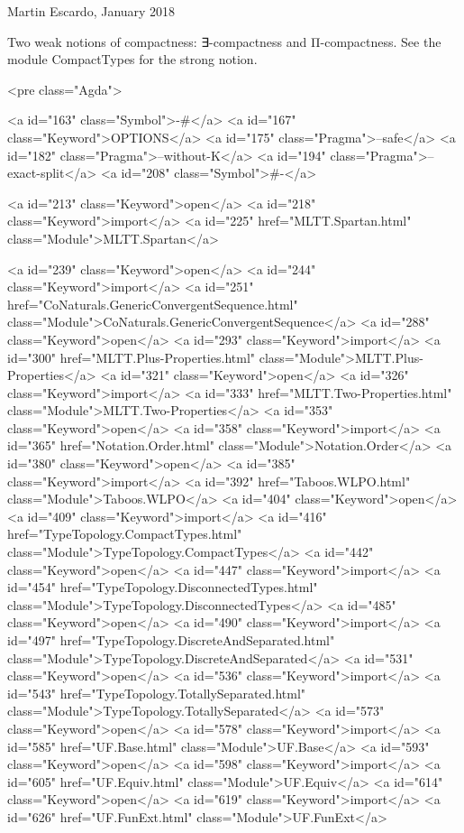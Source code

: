 Martin Escardo, January 2018

Two weak notions of compactness: ∃-compactness and Π-compactness. See
the module CompactTypes for the strong notion.

<pre class="Agda">

<a id="163" class="Symbol">{-#</a> <a id="167" class="Keyword">OPTIONS</a> <a id="175" class="Pragma">--safe</a> <a id="182" class="Pragma">--without-K</a> <a id="194" class="Pragma">--exact-split</a> <a id="208" class="Symbol">#-}</a>

<a id="213" class="Keyword">open</a> <a id="218" class="Keyword">import</a> <a id="225" href="MLTT.Spartan.html" class="Module">MLTT.Spartan</a>

<a id="239" class="Keyword">open</a> <a id="244" class="Keyword">import</a> <a id="251" href="CoNaturals.GenericConvergentSequence.html" class="Module">CoNaturals.GenericConvergentSequence</a>
<a id="288" class="Keyword">open</a> <a id="293" class="Keyword">import</a> <a id="300" href="MLTT.Plus-Properties.html" class="Module">MLTT.Plus-Properties</a>
<a id="321" class="Keyword">open</a> <a id="326" class="Keyword">import</a> <a id="333" href="MLTT.Two-Properties.html" class="Module">MLTT.Two-Properties</a>
<a id="353" class="Keyword">open</a> <a id="358" class="Keyword">import</a> <a id="365" href="Notation.Order.html" class="Module">Notation.Order</a>
<a id="380" class="Keyword">open</a> <a id="385" class="Keyword">import</a> <a id="392" href="Taboos.WLPO.html" class="Module">Taboos.WLPO</a>
<a id="404" class="Keyword">open</a> <a id="409" class="Keyword">import</a> <a id="416" href="TypeTopology.CompactTypes.html" class="Module">TypeTopology.CompactTypes</a>
<a id="442" class="Keyword">open</a> <a id="447" class="Keyword">import</a> <a id="454" href="TypeTopology.DisconnectedTypes.html" class="Module">TypeTopology.DisconnectedTypes</a>
<a id="485" class="Keyword">open</a> <a id="490" class="Keyword">import</a> <a id="497" href="TypeTopology.DiscreteAndSeparated.html" class="Module">TypeTopology.DiscreteAndSeparated</a>
<a id="531" class="Keyword">open</a> <a id="536" class="Keyword">import</a> <a id="543" href="TypeTopology.TotallySeparated.html" class="Module">TypeTopology.TotallySeparated</a>
<a id="573" class="Keyword">open</a> <a id="578" class="Keyword">import</a> <a id="585" href="UF.Base.html" class="Module">UF.Base</a>
<a id="593" class="Keyword">open</a> <a id="598" class="Keyword">import</a> <a id="605" href="UF.Equiv.html" class="Module">UF.Equiv</a>
<a id="614" class="Keyword">open</a> <a id="619" class="Keyword">import</a> <a id="626" href="UF.FunExt.html" class="Module">UF.FunExt</a>
